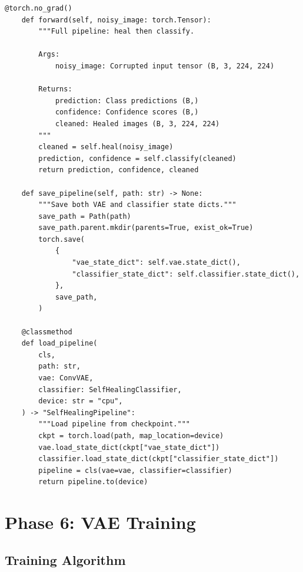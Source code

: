 \documentclass[11pt,a4paper]{article}
\begin{document}
\begin{lstlisting}[caption={src/pipeline.py - Complete File}, label={lst:pipeline}]
    @torch.no_grad()
    def forward(self, noisy_image: torch.Tensor):
        """Full pipeline: heal then classify.

        Args:
            noisy_image: Corrupted input tensor (B, 3, 224, 224)

        Returns:
            prediction: Class predictions (B,)
            confidence: Confidence scores (B,)
            cleaned: Healed images (B, 3, 224, 224)
        """
        cleaned = self.heal(noisy_image)
        prediction, confidence = self.classify(cleaned)
        return prediction, confidence, cleaned

    def save_pipeline(self, path: str) -> None:
        """Save both VAE and classifier state dicts."""
        save_path = Path(path)
        save_path.parent.mkdir(parents=True, exist_ok=True)
        torch.save(
            {
                "vae_state_dict": self.vae.state_dict(),
                "classifier_state_dict": self.classifier.state_dict(),
            },
            save_path,
        )

    @classmethod
    def load_pipeline(
        cls,
        path: str,
        vae: ConvVAE,
        classifier: SelfHealingClassifier,
        device: str = "cpu",
    ) -> "SelfHealingPipeline":
        """Load pipeline from checkpoint."""
        ckpt = torch.load(path, map_location=device)
        vae.load_state_dict(ckpt["vae_state_dict"])
        classifier.load_state_dict(ckpt["classifier_state_dict"])
        pipeline = cls(vae=vae, classifier=classifier)
        return pipeline.to(device)
\end{lstlisting}


\newpage
\section{Phase 6: VAE Training}
\label{sec:phase6}

\subsection{Training Algorithm}
\end{document}
